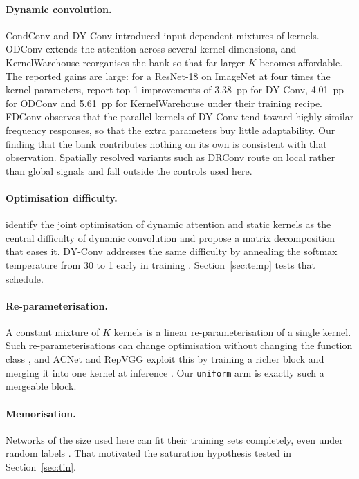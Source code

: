 \documentclass[10pt,a4paper]{article}
\begin{document}
\paragraph{Dynamic convolution.} CondConv \citep{yang2019condconv} and
DY-Conv \citep{chen2020dynamic} introduced input-dependent mixtures of
kernels. ODConv \citep{li2022odconv} extends the attention across several
kernel dimensions, and KernelWarehouse \citep{li2024kernelwarehouse}
reorganises the bank so that far larger $K$ becomes affordable. The
reported gains are large: for a ResNet-18 on ImageNet at four times the
kernel parameters, \citet{li2024kernelwarehouse} report top-1
improvements of \SI{3.38}{pp} for DY-Conv, \SI{4.01}{pp} for ODConv and
\SI{5.61}{pp} for KernelWarehouse under their training recipe. FDConv
\citep{chen2025fdconv} observes that the parallel kernels of DY-Conv tend
toward highly similar frequency responses, so that the extra parameters
buy little adaptability. Our finding that the bank contributes nothing on
its own is consistent with that observation. Spatially resolved variants
such as DRConv \citep{chen2021drconv} route on local rather than global
signals and fall outside the controls used here.

\paragraph{Optimisation difficulty.} \citet{li2021dcd} identify the joint
optimisation of dynamic attention and static kernels as the central
difficulty of dynamic convolution and propose a matrix decomposition that
eases it. DY-Conv addresses the same difficulty by annealing the softmax
temperature from 30 to 1 early in training \citep{chen2020dynamic}.
Section~\ref{sec:temp} tests that schedule.

\paragraph{Re-parameterisation.} A constant mixture of $K$ kernels is a
linear re-parameterisation of a single kernel. Such re-parameterisations
can change optimisation without changing the function class
\citep{arora2018optimization}, and ACNet and RepVGG exploit this by
training a richer block and merging it into one kernel at inference
\citep{ding2019acnet,ding2021repvgg}. Our \texttt{uniform} arm is exactly
such a mergeable block.

\paragraph{Memorisation.} Networks of the size used here can fit their
training sets completely, even under random labels \citep{zhang2017}.
That motivated the saturation hypothesis tested in Section~\ref{sec:tin}.
\end{document}
